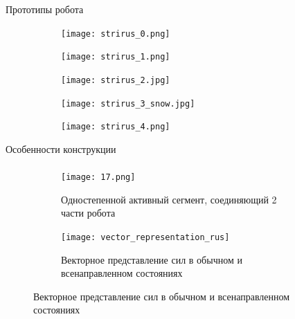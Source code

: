 \begin{frame}[c]{Прототипы робота}
    \begin{figure}[H]
        \begin{subfigure}{0.32\textwidth}
            \centering\texttt{[image: strirus\_0.png]}
        \end{subfigure}
        \begin{subfigure}{0.32\textwidth}
            \centering\texttt{[image: strirus\_1.png]}
        \end{subfigure}
        \begin{subfigure}{0.32\textwidth}
            \centering\texttt{[image: strirus\_2.jpg]}
        \end{subfigure}

        \begin{subfigure}{0.32\textwidth}
            \centering\texttt{[image: strirus\_3\_snow.jpg]}
        \end{subfigure}
        \begin{subfigure}{0.32\textwidth}
            \centering\texttt{[image: strirus\_4.png]}
        \end{subfigure}
    \end{figure}
\end{frame}


\begin{frame}[c]{Особенности конструкции}
    \framesubtitle{}
    \begin{figure}[H]
        \begin{subfigure}{0.39\textwidth}
            \centering\texttt{[image: 17.png]}
            \caption{Одностепенной активный сегмент, соединяющий 2 части робота}
        \end{subfigure}
        \begin{subfigure}{0.59\textwidth}
            \centering\texttt{[image: vector\_representation\_rus]}
            \caption{Векторное представление сил в обычном и всенаправленном состояниях}
        \end{subfigure}
    \end{figure}
\end{frame}

